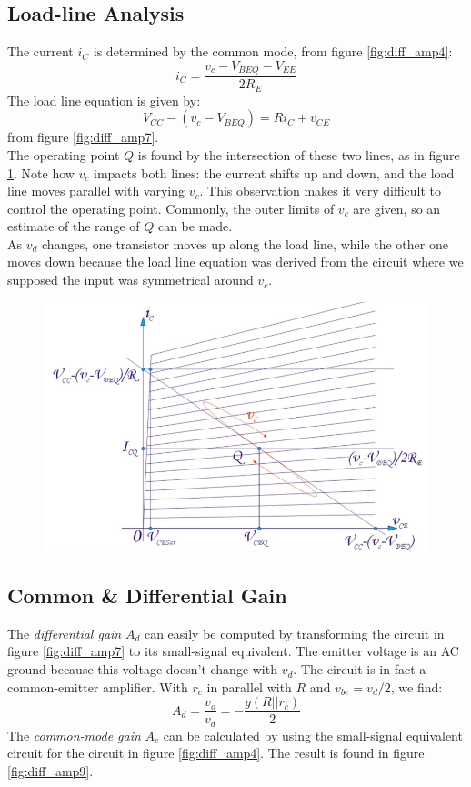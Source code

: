 \subsection{Load-line Analysis}
The current $i_C$ is determined by the common mode, from figure \ref{fig:diff_amp4}:
\begin{equation}
	i_C = \frac{v_c - V_{BEQ} - V_{EE}}{2R_E}
\end{equation}
The load line equation is given by:
\begin{equation}
	V_{CC} - (v_c - V_{BEQ}) = R i_C + v_{CE}
\end{equation}
from figure \ref{fig:diff_amp7}.\\
The operating point $Q$ is found by the intersection of these two lines, as in figure \ref{fig:diff_amp8}. Note how $v_c$ impacts both lines: the current shifts up and down, and the load line moves parallel with varying $v_c$. This observation makes it very difficult to control the operating point. Commonly, the outer limits of $v_c$ are given, so an estimate of the range of $Q$ can be made.\\
As $v_d$ changes, one transistor moves up along the load line, while the other one moves down because the load line equation was derived from the circuit where we supposed the input was symmetrical around $v_c$.\\
\begin{figure}[h!]
	\centering
	\includegraphics[width=12cm]{figures/ch02/diff_amp8.jpg}
	\caption{}
	\label{fig:diff_amp8}
\end{figure}

\subsection{Common \& Differential Gain}
The \emph{differential gain} $A_d$ can easily be computed by transforming the circuit in figure \ref{fig:diff_amp7} to its small-signal equivalent. The emitter voltage is an AC ground because this voltage doesn't change with $v_d$. The circuit is in fact a common-emitter amplifier. With $r_c$ in parallel with $R$ and $v_{be} = v_d/2$, we find:
\begin{equation}
	A_d = \frac{v_o}{v_d} = -\frac{g (R||r_c)}{2}
	\label{eq:differential_mode_gain}
\end{equation}
The \emph{common-mode gain} $A_c$ can be calculated by using the small-signal equivalent circuit for the circuit in figure \ref{fig:diff_amp4}. The result is found in figure \ref{fig:diff_amp9}. 

